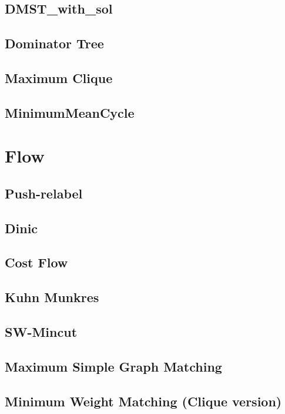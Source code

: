 \documentclass[a4paper,10pt,twocolumn,oneside]{article}
\begin{document}
\subsection{DMST\_with\_sol}

\subsection{Dominator Tree}

\subsection{Maximum Clique}

\subsection{MinimumMeanCycle}


\section{Flow}
\subsection{Push-relabel} %

\subsection{Dinic} %

\subsection{Cost Flow} %

\subsection{Kuhn Munkres}

\subsection{SW-Mincut}

\subsection{Maximum Simple Graph Matching}

\subsection{Minimum Weight Matching (Clique version)}

\end{document}
